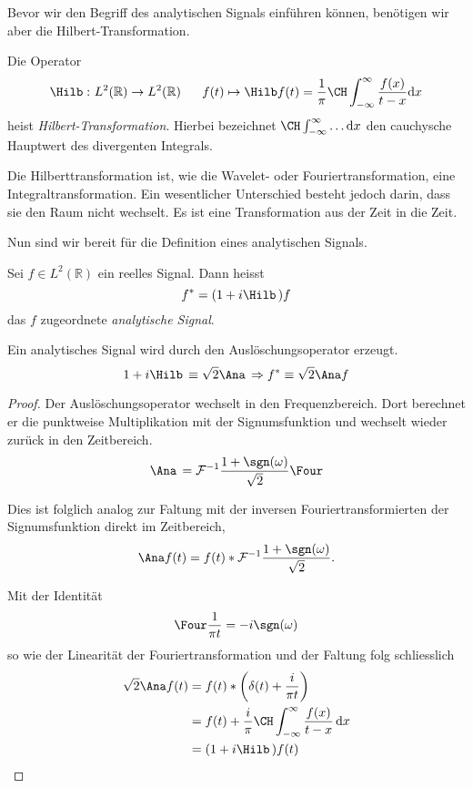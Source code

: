 Bevor wir den Begriff des analytischen Signals einführen können, benötigen wir aber die Hilbert-Transformation.
\begin{definition}
	Die Operator
 	\[
 	\Hilb\,\colon L^2(\mathbb R) \to L^2(\mathbb R)
 	~\quad~
 	f(t) \mapsto \Hilb f(t)
 	= \frac{1}{\pi} \CH\int_{-\infty}^{\infty}\frac{f(x)}{t-x} \mathrm{d}x
 	\]
 	heist \emph{Hilbert-Transformation}.
 	Hierbei bezeichnet $\CH\int_{-\infty}^{\infty} \dots \mathrm{d}x$ den cauchysche Hauptwert des divergenten Integrals.
\end{definition}

Die Hilberttransformation ist, wie die Wavelet- oder Fouriertransformation, eine Integraltransformation.
Ein wesentlicher Unterschied besteht jedoch darin, dass sie den Raum nicht wechselt.
Es ist eine Transformation aus der Zeit in die Zeit.

Nun sind wir bereit für die Definition eines analytischen Signals.
\begin{definition}
	\label{complex:analytic-signal}
	Sei $f \in L^2(\mathbb R)$ ein reelles Signal.
	Dann heisst
	\[f^\ast = (1 + i\Hilb\,)f \]
	das $f$ zugeordnete \emph{analytische Signal}.
\end{definition}
\begin{satz}
	Ein analytisches Signal wird durch den Auslöschungsoperator erzeugt.
	\[1 + i\Hilb\, \equiv \sqrt 2 \Ana\, \Rightarrow f^\ast \equiv \sqrt 2 \Ana f\]
\end{satz}

\begin{proof}
	Der Auslöschungsoperator wechselt in den Frequenzbereich.
	Dort berechnet er die punktweise Multiplikation mit der Signumsfunktion und wechselt wieder zurück in den Zeitbereich.
	\[\Ana\, = \mathcal{F}^{-1}\frac{1+\sgn(\omega)}{\sqrt 2}\Four\]
	
	Dies ist folglich analog zur Faltung mit der inversen Fouriertransformierten der Signumsfunktion direkt im Zeitbereich,
	\[ \Ana f(t) = f(t) * \mathcal{F}^{-1}\frac{1 + \sgn(\omega)}{\sqrt 2}. \]
	
	Mit der Identität
	\[\Four\frac{1}{\pi t} = -i\sgn(\omega)\]
	so wie der Linearität der Fouriertransformation und der Faltung folg schliesslich
	\begin{align*}
		\sqrt 2 \Ana f(t) 
		&= f(t) * \biggl(\delta(t) + \frac{i}{\pi t} \biggr)\\
		&= f(t) + \frac{i}{\pi} \CH\int_{-\infty}^{\infty} \frac{f(x)}{t - x} \,\mathrm{d}x\\
		&= (1 + i\Hilb\,) f(t)\qedhere
	\end{align*}
\end{proof}

